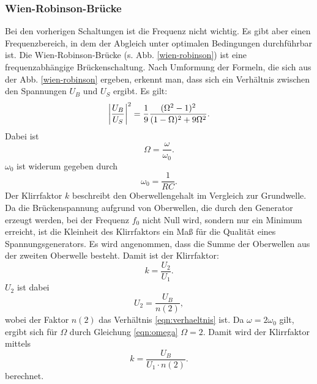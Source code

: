 \subsubsection{Wien-Robinson-Brücke}
Bei den vorherigen Schaltungen ist die Frequenz nicht wichtig. 
Es gibt aber einen Frequenzbereich, in dem der Abgleich unter optimalen Bedingungen durchführbar ist.
\newline
Die Wien-Robinson-Brücke (s. Abb. \ref{wien-robinson}) ist eine frequenzabhängige Brückenschaltung.
Nach Umformung der Formeln, die sich aus der Abb. \ref{wien-robinson} ergeben, erkennt man, dass
sich ein Verhältnis zwischen den Spannungen $U_B$ und $U_S$ ergibt. 
Es gilt:
\begin{equation}
    \abs{\frac{U_B}{U_S}}^2 = \frac{1}{9} \frac{(\Omega^2 -1)^2}{(1- \Omega)^2 + 9 \Omega^2}.
    \label{eqn:verhaeltnis}
\end{equation}
Dabei ist
\begin{equation}
    \Omega = \frac{\omega}{\omega_0}.
    \label{omega}
\end{equation}
$\omega_0$ ist widerum gegeben durch
\begin{equation}
    \omega_0 = \frac{1}{RC}.
    \label{omega0}
\end{equation}
\newline
Der Klirrfaktor $k$ beschreibt den Oberwellengehalt im Vergleich zur
Grundwelle. Da die Brückenspannung aufgrund von Oberwellen, die durch
den Generator erzeugt werden, bei der Frequenz $f_0$ nicht Null wird,
sondern nur ein Minimum erreicht, ist die Kleinheit des Klirrfaktors
ein Maß für die Qualität eines Spannungsgenerators.
\newline
Es wird angenommen, dass die Summe der Oberwellen aus der zweiten
Oberwelle besteht. Damit ist der Klirrfaktor:
\begin{equation*}
    k = \frac{U_2}{U_1}.
\end{equation*}
$U_2$ ist dabei
\begin{equation*}
    U_2 = \frac{U_B}{n(2)},
\end{equation*}
wobei der Faktor $n(2)$ das Verhältnis \eqref{eqn:verhaeltnis} ist. %
Da $\omega = 2 \omega_0$ gilt, ergibt sich für $\Omega$ durch Gleichung \eqref{eqn:omega}
$\Omega = 2$.
Damit wird der Klirrfaktor mittels
\begin{equation}
    k = \frac{U_B}{U_1 \cdot n(2)}. %
    \label{eqn:k}
\end{equation}
berechnet.

